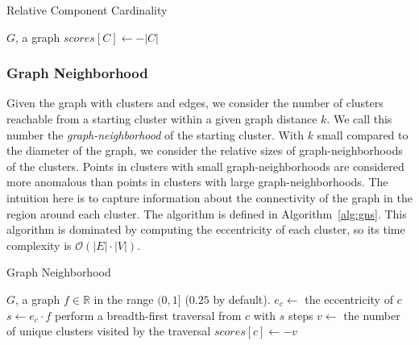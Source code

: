 \begin{algorithm}[h]
    \caption{Relative Component Cardinality}
    \label{alg:rcc}
\begin{algorithmic}[1]
    \REQUIRE $G$, a graph
        \STATE $scores[C] \gets -|C|$
    \ENDFOR
\end{algorithmic}
\end{algorithm}


\subsubsection{Graph Neighborhood}
Given the graph with clusters and edges, we consider the number of clusters reachable from a starting cluster within a given graph distance $k$.
We call this number the \textit{graph-neighborhood} of the starting cluster.
With $k$ small compared to the diameter of the graph, we consider the relative sizes of graph-neighborhoods of the clusters.
Points in clusters with small graph-neighborhoods are considered more anomalous than points in clusters with large graph-neighborhoods.
The intuition here is to capture information about the connectivity of the graph in the region around each cluster.
The algorithm is defined in Algorithm~\ref{alg:gns}.
This algorithm is dominated by computing the eccentricity of each cluster, so its time complexity is $\mathcal{O}(|E| \cdot |V|)$.

\begin{algorithm}[h]
    \caption{Graph Neighborhood}
    \label{alg:gns}
\begin{algorithmic}[1]
    \REQUIRE $G$, a graph
    \REQUIRE $f \in \mathbb{R}$ in the range $(0,1]$ ($0.25$ by default).
        \STATE $e_c \gets$ the eccentricity of $c$
        \STATE $s \gets e_c \cdot f$
        \STATE perform a breadth-first traversal from $c$ with $s$ steps
        \STATE $v \gets$ the number of unique clusters visited by the traversal
        \STATE $scores[c] \gets -v$
    \ENDFOR
\end{algorithmic}
\end{algorithm}


